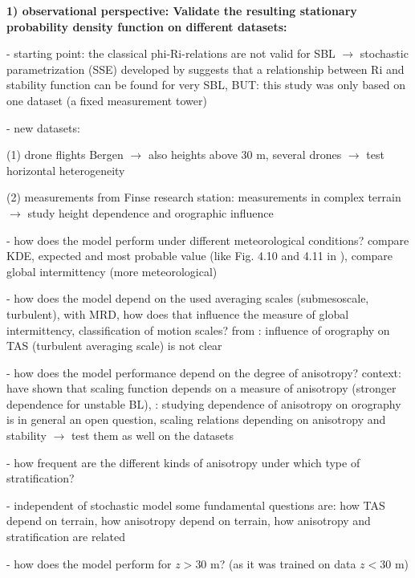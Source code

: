 \documentclass[11pt]{article}
\begin{document}
	
	\textbf{1) observational perspective: Validate the resulting stationary probability density function on different datasets:}
	\begin{compactenum}
		\item[-] starting point: the classical phi-Ri-relations are not valid for SBL $\rightarrow$ stochastic parametrization (SSE) developed by \cite{BoykoPaper2022} suggests that a relationship between Ri and stability function can be found for very SBL, BUT: this study was only based on one dataset (a fixed measurement tower)
		\item[-] new datasets: 
			\begin{compactenum}
				\item[(1)] drone flights Bergen \citep{Kral2021} $\rightarrow$ also heights above 30 m, several drones $\rightarrow$ test horizontal heterogeneity
				\item[(2)] measurements from Finse research station: measurements in complex terrain $\rightarrow$ study height dependence and orographic influence
			\end{compactenum}
		\item[-] how does the model perform under different meteorological conditions? compare KDE, expected and most probable value (like Fig. 4.10 and 4.11 in \cite{BoykoDiss2022}), compare global intermittency (more meteorological)
		\item[-] how does the model depend on the used averaging scales (submesoscale, turbulent), with MRD, how does that influence the measure of global intermittency, classification of motion scales? from \citet{Serafin2018}: influence of orography on TAS (turbulent averaging scale) is not clear
		\item[-] how does the model performance depend on the degree of anisotropy? context: \citet{Stiperski2018,Stiperski2019} have shown that scaling function depends on a measure of anisotropy (stronger dependence for unstable BL), \citet{Serafin2018}: studying dependence of anisotropy on orography is in general an open question, \citet{Stiperski2019} scaling relations depending on anisotropy and stability $\rightarrow$ test them as well on the datasets
		\item[-] how frequent are the different kinds of anisotropy under which type of stratification?
		\item[-] independent of stochastic model some fundamental questions are: how TAS depend on terrain, how anisotropy depend on terrain, how anisotropy and stratification are related
		\item[-] how does the model perform for $z>30$ m? (as it was trained on data $z<30$ m)

\end{compactenum}
\end{document}
